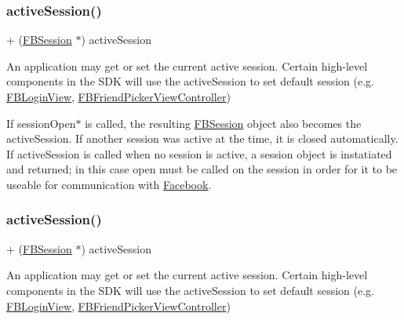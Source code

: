 \subsubsection{\texorpdfstring{active\+Session()}{activeSession()}\hspace{0.1cm}{\footnotesize\ttfamily [4/5]}}
{\footnotesize\ttfamily + (\hyperlink{interfaceFBSession}{F\+B\+Session} $\ast$) active\+Session \begin{DoxyParamCaption}{ }\end{DoxyParamCaption}}

An application may get or set the current active session. Certain high-\/level components in the S\+DK will use the active\+Session to set default session (e.\+g. {\ttfamily \hyperlink{interfaceFBLoginView}{F\+B\+Login\+View}}, {\ttfamily \hyperlink{interfaceFBFriendPickerViewController}{F\+B\+Friend\+Picker\+View\+Controller}})

If session\+Open$\ast$ is called, the resulting {\ttfamily \hyperlink{interfaceFBSession}{F\+B\+Session}} object also becomes the active\+Session. If another session was active at the time, it is closed automatically. If active\+Session is called when no session is active, a session object is instatiated and returned; in this case open must be called on the session in order for it to be useable for communication with \hyperlink{interfaceFacebook}{Facebook}. \mbox{\label{interfaceFBSession_aaf6863ab39e2f67733792453874d3870}} 
\subsubsection{\texorpdfstring{active\+Session()}{activeSession()}\hspace{0.1cm}{\footnotesize\ttfamily [5/5]}}
{\footnotesize\ttfamily + (\hyperlink{interfaceFBSession}{F\+B\+Session} $\ast$) active\+Session \begin{DoxyParamCaption}{ }\end{DoxyParamCaption}}

An application may get or set the current active session. Certain high-\/level components in the S\+DK will use the active\+Session to set default session (e.\+g. {\ttfamily \hyperlink{interfaceFBLoginView}{F\+B\+Login\+View}}, {\ttfamily \hyperlink{interfaceFBFriendPickerViewController}{F\+B\+Friend\+Picker\+View\+Controller}})

